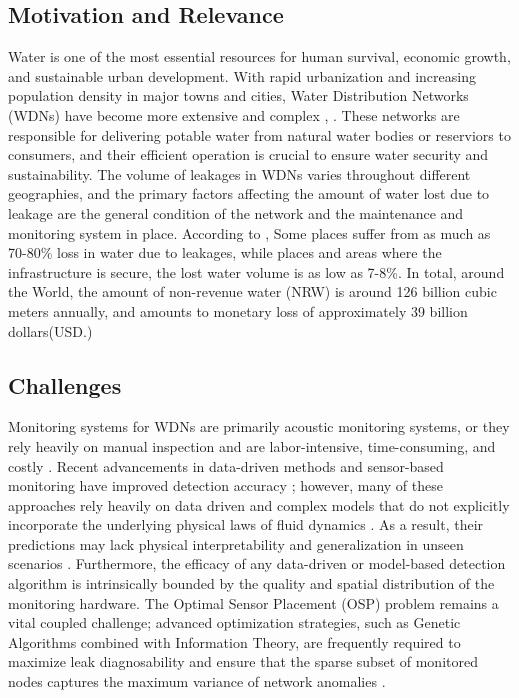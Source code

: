 \documentclass[final,5p,times,twocolumn,authoryear]{elsarticle}
\begin{document}
\subsection{Motivation and Relevance}
Water is one of the most essential resources for human survival, economic growth, and sustainable urban development. With rapid urbanization and increasing population density in major towns and cities, Water Distribution Networks (WDNs) have become more extensive and complex \cite{SALEHI2022106936} , \cite{Gupta2018}.  These networks are responsible for delivering potable water from natural water bodies or reserviors to consumers, and their efficient operation is crucial to ensure water security and sustainability.
The volume of leakages in WDNs varies throughout different geographies, and the primary factors affecting the amount of water lost due to leakage are the general condition of the network and the maintenance and monitoring system in place. According to \cite{serafeim2024leakages}, Some places suffer from as much as 70-80\% loss in water due to leakages, while places and areas where the infrastructure is secure, the lost water volume is as low as 7-8\%. In total, around the World, the amount of non-revenue water (NRW) is around 126 billion cubic meters annually, and amounts to monetary loss of approximately 39 billion dollars(USD.) \cite{article_liem}

\subsection{Challenges}
Monitoring systems for WDNs are primarily acoustic monitoring systems, or they rely heavily on manual inspection and are labor-intensive, time-consuming, and costly \cite{w16202975}. Recent advancements in data-driven methods and sensor-based monitoring have improved detection accuracy \cite{smartcities9030045}; however, many of these approaches rely heavily on data driven and complex models that do not explicitly incorporate the underlying physical laws of fluid dynamics \cite{LIU2025111432}. As a result, their predictions may lack physical interpretability and generalization in unseen scenarios \cite{s25165069}. Furthermore, the efficacy of any data-driven or model-based detection algorithm is intrinsically bounded by the quality and spatial distribution of the monitoring hardware. The Optimal Sensor Placement (OSP) problem remains a vital coupled challenge; advanced optimization strategies, such as Genetic Algorithms combined with Information Theory, are frequently required to maximize leak diagnosability and ensure that the sparse subset of monitored nodes captures the maximum variance of network anomalies \cite{s22020443}.
\end{document}
